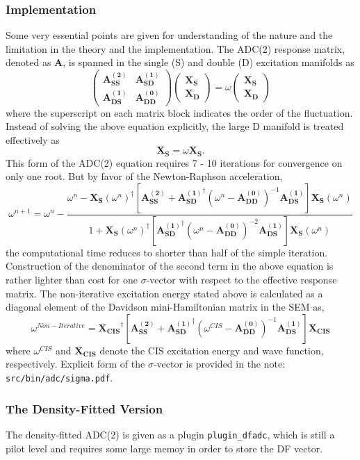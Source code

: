 \subsubsection{Implementation}
Some very essential points are given for understanding of the nature and the limitation in  the theory and the implementation. The ADC(2) response matrix, denoted as $\mathbf{A}$, is spanned in the single (S) and double (D) excitation manifolds as 
\begin{equation*}
\begin{pmatrix}
\mathbf{A_{SS}^{(2)}} & \mathbf{A_{SD}^{(1)}}\\
\mathbf{A_{DS}^{(1)}} & \mathbf{A_{DD}^{(0)}}
\end{pmatrix}
\begin{pmatrix}
\mathbf{X_S}\\
\mathbf{X_D}
\end{pmatrix}
=\omega
\begin{pmatrix}
\mathbf{X_S}\\
\mathbf{X_D}
\end{pmatrix}
\end{equation*}
where the superscript on each matrix block indicates the order of the fluctuation. Instead of solving the above equation explicitly, the large D manifold is treated effectively as
\begin{equation*}
[\mathbf{A_{SS}^{(2)}}+\mathbf{A_{SD}^{(1)}}^{\dagger}(\omega-\mathbf{A_{DD}^{(0)}})^{-1}\mathbf{A_{DS}^{(1)}}]\mathbf{X_{S}}=\omega\mathbf{X_{S}}.
\end{equation*}
This form of the ADC(2) equation requires 7 - 10 iterations for convergence on only one root. But by favor of the Newton-Raphson acceleration, 
\begin{equation*}
\omega^{n+1}=\omega^{n}-\frac{\omega^n-\mathbf{X_{S}}(\omega^n)^{\dagger}[\mathbf{A_{SS}^{(2)}}+\mathbf{A_{SD}^{(1)}}^{\dagger}(\omega^n-\mathbf{A_{DD}^{(0)}})^{-1}\mathbf{A_{DS}^{(1)}}]\mathbf{X_{S}}(\omega^n)}{1+\mathbf{X_{S}}(\omega^n)^{\dagger}[\mathbf{A_{SD}^{(1)}}^{\dagger}(\omega^n-\mathbf{A_{DD}^{(0)}})^{-2}\mathbf{A_{DS}^{(1)}}]\mathbf{X_{S}}(\omega^n)}
\end{equation*}
the computational time reduces to shorter than half of the simple iteration. Construction of the denominator of the second term in the above equation is rather lighter than cost for one $\sigma$-vector with respect to the effective response matrix. The non-iterative excitation energy stated above is calculated as a diagonal element of the Davidson mini-Hamiltonian matrix in the SEM as,
\begin{equation*}
\omega^{Non-Iterative}=\mathbf{X_{CIS}}^{\dagger}[\mathbf{A_{SS}^{(2)}}+\mathbf{A_{SD}^{(1)}}^{\dagger}(\omega^{CIS}-\mathbf{A_{DD}^{(0)}})^{-1}\mathbf{A_{DS}^{(1)}}]\mathbf{X_{CIS}}
\end{equation*}
where $\omega^{CIS}$ and $\mathbf{X_{CIS}}$ denote the CIS excitation energy and wave function, respectively. Explicit form of the $\sigma$-vector is provided in the note: \verb|src/bin/adc/sigma.pdf|. 

\subsubsection{The Density-Fitted Version}
The density-fitted ADC(2) is given as a plugin \verb|plugin_dfadc|, which is still a pilot level and requires some large memoy in order to store the DF vector.